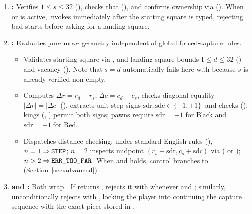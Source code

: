 \begin{enumerate}
    \item \textbf{:} Verifies $1 \le s \le 32$ (), checks that  (), and confirms ownership via  (). When  or  is active,  invokes  immediately after the starting square is typed, rejecting bad starts before asking for a landing square.
    \item \textbf{:} Evaluates pure move geometry independent of global forced-capture rules:
    \begin{itemize}
        \item Validates starting square via , and landing square bounds $1 \le d \le 32$ () and vacancy  (). Note that $s = d$ automatically fails here with  because $s$ is already verified non-empty.
        \item Computes $\Delta r = r_d - r_s$, $\Delta c = c_d - c_s$, checks diagonal equality $|\Delta r| = |\Delta c|$ (), extracts unit step signs $\text{sdr}, \text{sdc} \in \{-1, +1\}$, and checks  (): kings (, ) permit both signs; pawns require $\text{sdr} = -1$ for Black and $\text{sdr} = +1$ for Red.
        \item Dispatches distance checking: under standard English rules (), $n = 1 \Rightarrow \texttt{STEP}$; $n = 2$ inspects midpoint $(r_s + \text{sdr}, c_s + \text{sdc})$ via  ( or ); $n > 2 \Rightarrow \texttt{ERR\_TOO\_FAR}$. When  and  holds, control branches to  (Section~\ref{sec:advanced}).
    \end{itemize}
    \item \textbf{ and :} Both wrap . If  returns ,  rejects it with  whenever  and ; similarly,  unconditionally rejects  with , locking the player into continuing the capture sequence with the exact piece stored in .
\end{enumerate}

